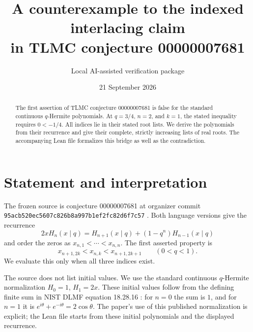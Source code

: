 \documentclass[11pt]{article}
\title{A counterexample to the indexed interlacing claim\\in TLMC conjecture 00000007681}
\author{Local AI-assisted verification package}
\date{21 September 2026}
\begin{document}
\maketitle

\begin{abstract}
The first assertion of TLMC conjecture 00000007681 is false for the
standard continuous $q$-Hermite polynomials. At $q=3/4$, $n=2$, and $k=1$,
the stated inequality requires $0<-1/4$. All indices lie in their stated
root lists. We derive the polynomials from their recurrence and give their
complete, strictly increasing lists of real roots. The accompanying Lean
file formalizes this bridge as well as the contradiction.
\end{abstract}

\section{Statement and interpretation}
The frozen source is conjecture 00000007681 at organizer commit\\
\texttt{95acb520ec5607c826b8a997b1ef2fc82d6f7c57} \cite{tlmc}.
Both language versions give the recurrence
\[
 2xH_n(x\mid q)=H_{n+1}(x\mid q)+(1-q^n)H_{n-1}(x\mid q)
\]
and order the zeros as $x_{n,1}<\cdots<x_{n,n}$.
The first asserted property is
\begin{equation}\label{eq:claim}
 x_{n+1,2k}<x_{n,k}<x_{n+1,2k+1}\qquad(0<q<1).
\end{equation}
We evaluate this only when all three indices exist.

The source does not list initial values. We use the standard continuous
$q$-Hermite normalization $H_0=1$, $H_1=2x$. These initial values follow
from the defining finite sum in NIST DLMF equation 18.28.16 \cite{dlmf}:
for $n=0$ the sum is $1$, and for $n=1$ it is
$e^{i\theta}+e^{-i\theta}=2\cos\theta$.
The paper's use of this published normalization is explicit; the Lean file
starts from these initial polynomials and the displayed recurrence.
\end{document}
